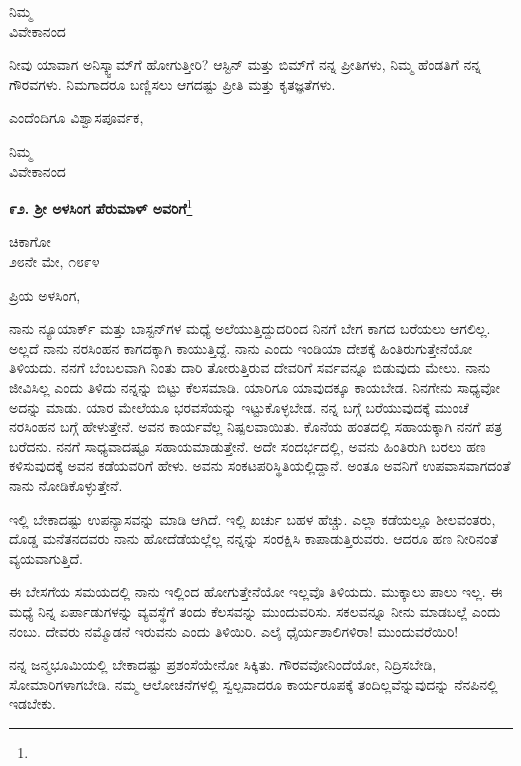 {\flushright
ನಿಮ್ಮ\\ವಿವೇಕಾನಂದ\par}

\vspace{0.2cm}

ನೀವು ಯಾವಾಗ ಅನಿಸ್ಕ್ವಾಮ್‌ಗೆ ಹೋಗುತ್ತೀರಿ? ಆಸ್ಟಿನ್ ಮತ್ತು ಬಿಮ್‌ಗೆ ನನ್ನ ಪ್ರೀತಿಗಳು, ನಿಮ್ಮ ಹೆಂಡತಿಗೆ ನನ್ನ ಗೌರವಗಳು. ನಿಮಗಾದರೂ ಬಣ್ಣಿಸಲು ಆಗದಷ್ಟು ಪ್ರೀತಿ ಮತ್ತು ಕೃತಜ್ಞತೆಗಳು.

ಎಂದೆಂದಿಗೂ ವಿಶ್ವಾಸಪೂರ್ವಕ,

{\flushright
ನಿಮ್ಮ\\ವಿವೇಕಾನಂದ\par}

\newpage

\begin{center}
\textbf{೯೨. ಶ‍್ರೀ ಅಳಸಿಂಗ ಪೆರುಮಾಳ್ ಅವರಿಗೆ}\footnote{}
\end{center}

\begin{flushright}
ಚಿಕಾಗೋ\\೨೮ನೇ ಮೇ, ೧೮೯೪
\end{flushright}

ಪ್ರಿಯ ಅಳಸಿಂಗ,

ನಾನು ನ್ಯೂಯಾರ್ಕ್ ಮತ್ತು ಬಾಸ್ಟನ್‌ಗಳ ಮಧ್ಯೆ ಅಲೆಯುತ್ತಿದ್ದುದರಿಂದ ನಿನಗೆ ಬೇಗ ಕಾಗದ ಬರೆಯಲು ಆಗಲಿಲ್ಲ. ಅಲ್ಲದೆ ನಾನು ನರಸಿಂಹನ ಕಾಗದಕ್ಕಾಗಿ ಕಾಯುತ್ತಿದ್ದೆ. ನಾನು ಎಂದು ಇಂಡಿಯಾ ದೇಶಕ್ಕೆ ಹಿಂತಿರುಗುತ್ತೇನೆಯೋ ತಿಳಿಯದು. ನನಗೆ ಬೆಂಬಲವಾಗಿ ನಿಂತು ದಾರಿ ತೋರುತ್ತಿರುವ ದೇವರಿಗೆ ಸರ್ವವನ್ನೂ ಬಿಡುವುದು ಮೇಲು. ನಾನು ಜೀವಿಸಿಲ್ಲ ಎಂದು ತಿಳಿದು ನನ್ನನ್ನು ಬಿಟ್ಟು ಕೆಲಸಮಾಡಿ. ಯಾರಿಗೂ ಯಾವುದಕ್ಕೂ ಕಾಯಬೇಡ. ನಿನಗೇನು ಸಾಧ್ಯವೋ ಅದನ್ನು ಮಾಡು. ಯಾರ ಮೇಲೆಯೂ ಭರವಸೆಯನ್ನು ಇಟ್ಟುಕೊಳ್ಳಬೇಡ. ನನ್ನ ಬಗ್ಗೆ ಬರೆಯುವುದಕ್ಕೆ ಮುಂಚೆ ನರಸಿಂಹನ ಬಗ್ಗೆ ಹೇಳುತ್ತೇನೆ. ಅವನ ಕಾರ್ಯವೆಲ್ಲ ನಿಷ್ಪಲವಾಯಿತು. ಕೊನೆಯ ಹಂತದಲ್ಲಿ ಸಹಾಯಕ್ಕಾಗಿ ನನಗೆ ಪತ್ರ ಬರೆದನು. ನನಗೆ ಸಾಧ್ಯವಾದಷ್ಟೂ ಸಹಾಯಮಾಡುತ್ತೇನೆ. ಅದೇ ಸಂದರ್ಭದಲ್ಲಿ, ಅವನು ಹಿಂತಿರುಗಿ ಬರಲು ಹಣ ಕಳಿಸುವುದಕ್ಕೆ ಅವನ ಕಡೆಯವರಿಗೆ ಹೇಳು. ಅವನು ಸಂಕಟಪರಿಸ್ಥಿತಿಯಲ್ಲಿದ್ದಾನೆ. ಅಂತೂ ಅವನಿಗೆ ಉಪವಾಸವಾಗದಂತೆ ನಾನು ನೋಡಿಕೊಳ್ಳುತ್ತೇನೆ.

ಇಲ್ಲಿ ಬೇಕಾದಷ್ಟು ಉಪನ್ಯಾಸವನ್ನು ಮಾಡಿ ಆಗಿದೆ. ಇಲ್ಲಿ ಖರ್ಚು ಬಹಳ ಹೆಚ್ಚು. ಎಲ್ಲಾ ಕಡೆಯಲ್ಲೂ ಶೀಲವಂತರು, ದೊಡ್ಡ ಮನೆತನದವರು ನಾನು ಹೋದೆಡೆಯಲ್ಲೆಲ್ಲ ನನ್ನನ್ನು ಸಂರಕ್ಷಿಸಿ ಕಾಪಾಡುತ್ತಿರುವರು. ಆದರೂ ಹಣ ನೀರಿನಂತೆ ವ್ಯಯವಾಗುತ್ತಿದೆ.

ಈ ಬೇಸಗೆಯ ಸಮಯದಲ್ಲಿ ನಾನು ಇಲ್ಲಿಂದ ಹೋಗುತ್ತೇನೆಯೋ ಇಲ್ಲವೊ ತಿಳಿಯದು. ಮುಕ್ಕಾಲು ಪಾಲು ಇಲ್ಲ. ಈ ಮಧ್ಯೆ ನಿನ್ನ ಏರ್ಪಾಡುಗಳನ್ನು ವ್ಯವಸ್ಥೆಗೆ ತಂದು ಕೆಲಸವನ್ನು ಮುಂದುವರಿಸು. ಸಕಲವನ್ನೂ ನೀನು ಮಾಡಬಲ್ಲೆ ಎಂದು ನಂಬು. ದೇವರು ನಮ್ಮೊಡನೆ ಇರುವನು ಎಂದು ತಿಳಿಯಿರಿ. ಎಲೈ ಧೈರ್ಯಶಾಲಿಗಳಿರಾ! ಮುಂದುವರೆಯಿರಿ!

ನನ್ನ ಜನ್ಮಭೂಮಿಯಲ್ಲಿ ಬೇಕಾದಷ್ಟು ಪ್ರಶಂಸೆಯೇನೋ ಸಿಕ್ಕಿತು. ಗೌರವವೋ\break ನಿಂದೆಯೋ, ನಿದ್ರಿಸಬೇಡಿ, ಸೋಮಾರಿಗಳಾಗಬೇಡಿ. ನಮ್ಮ ಆಲೋಚನೆಗಳಲ್ಲಿ ಸ್ವಲ್ಪವಾದರೂ ಕಾರ್ಯರೂಪಕ್ಕೆ ತಂದಿಲ್ಲವೆನ್ನುವುದನ್ನು ನೆನಪಿನಲ್ಲಿ ಇಡಬೇಕು.

